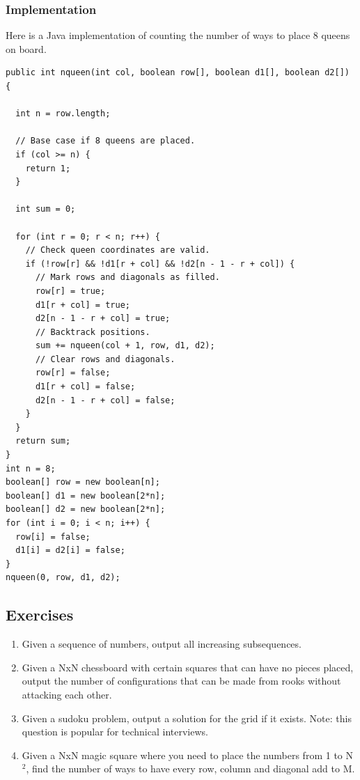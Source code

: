 \documentclass[11pt,oneside]{book}
\begin{document}
\subsubsection{Implementation}

Here is a Java implementation of counting the number of ways to place 8 queens on board.

\begin{lstlisting}
public int nqueen(int col, boolean row[], boolean d1[], boolean d2[]) {
  
  int n = row.length;
  
  // Base case if 8 queens are placed.
  if (col >= n) {
    return 1;
  }

  int sum = 0;

  for (int r = 0; r < n; r++) {
    // Check queen coordinates are valid.
    if (!row[r] && !d1[r + col] && !d2[n - 1 - r + col]) {
      // Mark rows and diagonals as filled.
      row[r] = true;
      d1[r + col] = true;
      d2[n - 1 - r + col] = true;
      // Backtrack positions.
      sum += nqueen(col + 1, row, d1, d2);
      // Clear rows and diagonals.
      row[r] = false;
      d1[r + col] = false;
      d2[n - 1 - r + col] = false;
    }
  }
  return sum;
}
int n = 8;
boolean[] row = new boolean[n];
boolean[] d1 = new boolean[2*n];
boolean[] d2 = new boolean[2*n];
for (int i = 0; i < n; i++) {
  row[i] = false;
  d1[i] = d2[i] = false;
}
nqueen(0, row, d1, d2);
\end{lstlisting}

\subsection{Exercises}

\begin{enumerate}
\item Given a sequence of numbers, output all increasing subsequences.
\item Given a NxN chessboard with certain squares that can have no pieces placed, output the number of configurations that can be made from rooks without attacking each other.
\item Given a sudoku problem, output a solution for the grid if it exists. Note: this question is popular for technical interviews.
\item Given a NxN magic square where you need to place the numbers from 1 to N$^{2}$, find the number of ways to have every row, column and diagonal add to M.
\end{enumerate}
\end{document}
